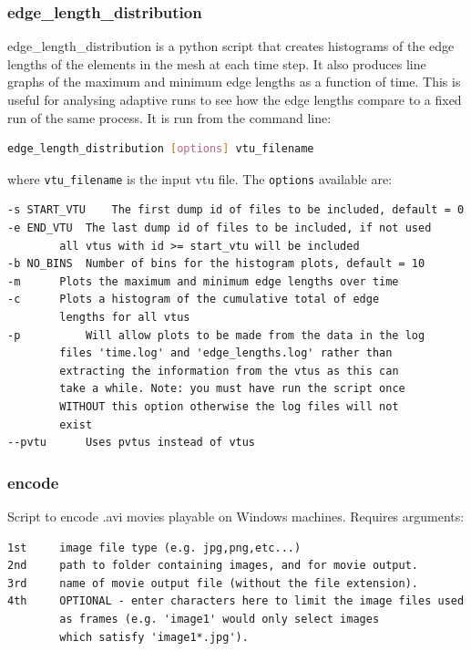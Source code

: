 
\subsubsection{edge\_length\_distribution}
\label{sec:edgelengthdist}

edge\_length\_distribution is a python script that creates histograms of the edge lengths of the elements in the mesh at each time step. It also produces line graphs of the maximum and minimum edge lengths as a function of time. This is useful for analysing adaptive runs to see how the edge lengths compare to a fixed run of the same process.  It is run from the command line:
\begin{lstlisting}[language = Bash]
edge_length_distribution [options] vtu_filename
\end{lstlisting}
where \lstinline[language = Python]+vtu_filename+ is the input vtu file. The \lstinline[language = Bash]+options+ available are:
\begin{lstlisting}
-s START_VTU	The first dump id of files to be included, default = 0
-e END_VTU	The last dump id of files to be included, if not used
		all vtus with id >= start_vtu will be included
-b NO_BINS	Number of bins for the histogram plots, default = 10
-m		Plots the maximum and minimum edge lengths over time
-c		Plots a histogram of the cumulative total of edge
		lengths for all vtus
-p        	Will allow plots to be made from the data in the log
		files 'time.log' and 'edge_lengths.log' rather than
		extracting the information from the vtus as this can
		take a while. Note: you must have run the script once
		WITHOUT this option otherwise the log files will not
		exist
--pvtu		Uses pvtus instead of vtus

\end{lstlisting}


\subsubsection{encode}
\label{sec:encode}
Script to encode .avi movies playable on Windows machines. Requires arguments:
\begin{lstlisting}
1st     image file type (e.g. jpg,png,etc...)
2nd     path to folder containing images, and for movie output.
3rd     name of movie output file (without the file extension).
4th     OPTIONAL - enter characters here to limit the image files used
        as frames (e.g. 'image1' would only select images
        which satisfy 'image1*.jpg').
\end{lstlisting}

